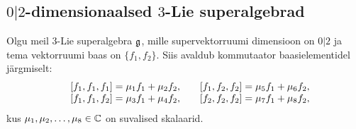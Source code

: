 
\subsection{\texorpdfstring{$0|2$}{0|2}-dimensionaalsed
    \texorpdfstring{$3$}{3}-Lie superalgebrad}

Olgu meil $3$-Lie superalgebra $\mathfrak{g}$, mille supervektorruumi dimensioon
on $0|2$ ja tema vektorruumi baas on $\{ f_1, f_2 \}$. Siis avaldub
kommutaator baasielementidel järgmiselt:
\begin{align*}
    \begin{matrix*}[l]
        & [f_1, f_1, f_1] = \m_1 f_1 + \m_2 f_2, \quad
        & [f_1, f_2, f_2] = \m_5 f_1 + \m_6 f_2, \\
        & [f_1, f_1, f_2] = \m_3 f_1 + \m_4 f_2, \quad
        & [f_2, f_2, f_2] = \m_7 f_1 + \m_8 f_2, \\
    \end{matrix*}
\end{align*}
kus $\mu_1, \mu_2, \dots, \mu_8 \in \mathbb{C}$ on suvalised skalaarid.

